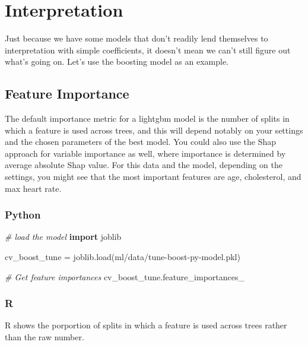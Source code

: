 \documentclass[
  letterpaper,
]{krantz}
\newenvironment{Shaded}{}{}
\newcommand{\CommentTok}[1]{\textcolor[rgb]{0.38,0.63,0.69}{\textit{#1}}}
\newcommand{\FunctionTok}[1]{\textcolor[rgb]{0.02,0.16,0.49}{#1}}
\newcommand{\ImportTok}[1]{\textcolor[rgb]{0.00,0.50,0.00}{\textbf{#1}}}
\newcommand{\NormalTok}[1]{#1}
\newcommand{\OperatorTok}[1]{\textcolor[rgb]{0.40,0.40,0.40}{#1}}
\newcommand{\SpecialCharTok}[1]{\textcolor[rgb]{0.25,0.44,0.63}{#1}}
\newcommand{\StringTok}[1]{\textcolor[rgb]{0.25,0.44,0.63}{#1}}
\begin{document}
\section{Interpretation}\label{interpretation}

Just because we have some models that don't readily lend themselves to
interpretation with simple coefficients, it doesn't mean we can't still
figure out what's going on. Let's use the boosting model as an example.

\subsection{Feature Importance}\label{feature-importance-1}

The default importance metric for a lightgbm model is the number of
splits in which a feature is used across trees, and this will depend
notably on your settings and the chosen parameters of the best model.
You could also use the Shap approach for variable importance as well,
where importance is determined by average absolute Shap value. For this
data and the model, depending on the settings, you might see that the
most important features are age, cholesterol, and max heart rate.

\subsubsection{Python}

\begin{Shaded}
\begin{Highlighting}[]
\CommentTok{\# load the model}
\ImportTok{import}\NormalTok{ joblib}

\NormalTok{cv\_boost\_tune }\OperatorTok{=}\NormalTok{ joblib.load(}\StringTok{\textquotesingle{}ml/data/tune{-}boost{-}py{-}model.pkl\textquotesingle{}}\NormalTok{)}

\CommentTok{\# Get feature importances}
\NormalTok{cv\_boost\_tune.feature\_importances\_}
\end{Highlighting}
\end{Shaded}

\subsubsection{R}

R shows the porportion of splits in which a feature is used across trees
rather than the raw number.

\begin{Shaded}
\end{Shaded}
\end{document}
